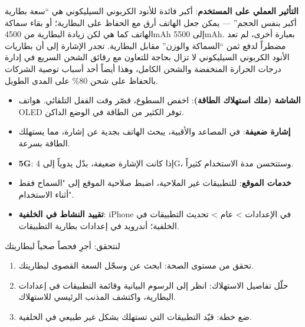\textbf{التأثير العملي على المستخدم}: أكبر فائدة للأنود الكربوني السيليكوني هي “سعة بطارية أكبر بنفس الحجم” — يمكن جعل الهاتف أرق مع الحفاظ على البطارية؛ أو بقاء سماكة الهاتف كما هي لكن زيادة البطارية من 4500mAh إلى 5500mAh. بعبارة أخرى، لم تعد مضطراً لدفع ثمن “السماكة والوزن” مقابل البطارية. تجدر الإشارة إلى أن بطاريات الأنود الكربوني السيليكوني لا تزال بحاجة للتعاون مع رقائق الشحن السريع في إدارة درجات الحرارة المنخفضة والشحن الكامل، وهذا أيضاً أحد أسباب توصية الشركات بالحفاظ على شحن 80\% على المدى الطويل.


\begin{itemize}
  \item \textbf{الشاشة (ملك استهلاك الطاقة)}: اخفض السطوع، قصّر وقت القفل التلقائي. هواتف OLED توفر الكثير من الطاقة في الوضع الداكن.
  \item \textbf{إشارة ضعيفة}: في المصاعد والأقبية، يبحث الهاتف بجدية عن إشارة، مما يستهلك الطاقة بسرعة.
  \item \textbf{5G}: إذا كانت الإشارة ضعيفة، بدّل يدوياً إلى 4G، وستتحسن مدة الاستخدام كثيراً.
  \item \textbf{خدمات الموقع}: للتطبيقات غير الملاحية، اضبط صلاحية الموقع إلى "السماح فقط أثناء الاستخدام".
  \item \textbf{تقييد النشاط في الخلفية}: iPhone في الإعدادات > عام > تحديث التطبيقات في الخلفية؛ أندرويد في إعدادات بطارية التطبيقات.
\end{itemize}

\begin{tcbpractice}{لنتحقق: أجرِ فحصاً صحياً لبطاريتك}
\begin{enumerate}
  \item تحقق من مستوى الصحة: ابحث عن وسجّل السعة القصوى لبطاريتك.
  \item حلّل تفاصيل الاستهلاك: انظر إلى الرسوم البيانية وقائمة التطبيقات في إعدادات البطارية، واكتشف المذنب الرئيسي للاستهلاك.
  \item ضع خطة: قيّد التطبيقات التي تستهلك بشكل غير طبيعي في الخلفية.
\end{enumerate}

\end{tcbpractice}
